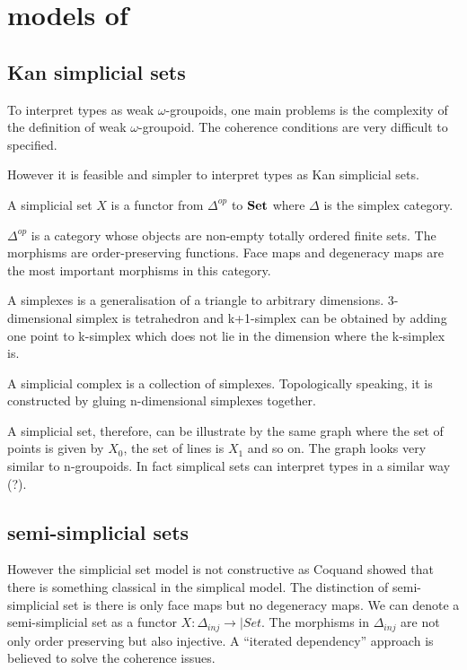 \section{models of \hott}

\subsection{Kan simplicial sets}

To interpret types as weak $\omega$-groupoids, one main problems is
the complexity of the definition of weak $\omega$-groupoid. The
coherence conditions are very difficult to specified.

However it is feasible and simpler to interpret types as Kan
simplicial sets.

\begin{definition}
A simplicial set $X$ is a functor from $\Delta^{op}$ to $\operatorname{\mathbf{Set}}$ where
$\Delta$ is the simplex category.
\end{definition}

$\Delta^{op}$ is a category whose objects are non-empty totally ordered
finite sets. The morphisms are order-preserving functions. 
Face maps and degeneracy maps are the most important morphisms in this
category.  

A simplexes is a generalisation of a triangle to arbitrary
dimensions. 3-dimensional simplex is tetrahedron and k+1-simplex can
be obtained by adding one point to k-simplex which does not lie in the
dimension where the k-simplex is.

A simplicial complex is a collection of simplexes. Topologically speaking, it
is constructed by gluing n-dimensional simplexes together. 

A simplicial set, therefore, can be illustrate by the same graph where
the set of points is given by $X_0$, the set of lines is $X_1$ and so
on. The graph looks very similar to n-groupoids. In fact simplical
sets can interpret types in a similar way (?).


\subsection{semi-simplicial sets}


However the simplicial set model is not constructive as Coquand showed
that there is something classical in the simplical model.
The distinction of semi-simplicial set is there is only face maps
but no degeneracy maps. We can denote a semi-simplicial set as a
functor $X : \Delta_{inj} \rightarrow |Set$. The morphisms in $\Delta_{inj}$ are not only order preserving
but also injective.
A “iterated dependency” approach is believed to solve the coherence
issues.

